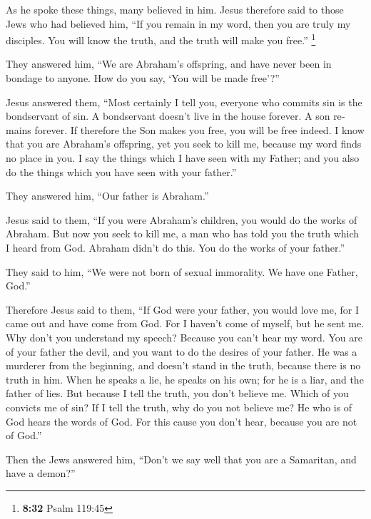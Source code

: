 \begin{paracol}{2}
\begin{otherlanguage}{english}
 As he spoke these things, many believed in him.
 Jesus therefore said to those Jews who had believed him,
``If you remain in my word, then you are truly my disciples.
 You will know the truth, and the truth will make you
free.'' \footnote{\textbf{8:32} Psalm 119:45}

 They answered him, ``We are Abraham's offspring, and
have never been in bondage to anyone. How do you say, `You will be made
free'?''

 Jesus answered them, ``Most certainly I tell you,
everyone who commits sin is the bondservant of sin.  A
bondservant doesn't live in the house forever. A son remains forever.
 If therefore the Son makes you free, you will be free
indeed.  I know that you are Abraham's offspring, yet you
seek to kill me, because my word finds no place in you. 
I say the things which I have seen with my Father; and you also do the
things which you have seen with your father.''

 They answered him, ``Our father is Abraham.''

Jesus said to them, ``If you were Abraham's children, you would do the
works of Abraham.  But now you seek to kill me, a man who
has told you the truth which I heard from God. Abraham didn't do this.
 You do the works of your father.''

They said to him, ``We were not born of sexual immorality. We have one
Father, God.''

 Therefore Jesus said to them, ``If God were your father,
you would love me, for I came out and have come from God. For I haven't
come of myself, but he sent me.  Why don't you understand
my speech? Because you can't hear my word.  You are of
your father the devil, and you want to do the desires of your father. He
was a murderer from the beginning, and doesn't stand in the truth,
because there is no truth in him. When he speaks a lie, he speaks on his
own; for he is a liar, and the father of lies.  But
because I tell the truth, you don't believe me.  Which of
you convicts me of sin? If I tell the truth, why do you not believe me?
 He who is of God hears the words of God. For this cause
you don't hear, because you are not of God.''

 Then the Jews answered him, ``Don't we say well that you
are a Samaritan, and have a demon?''


\end{otherlanguage}
\end{paracol}

